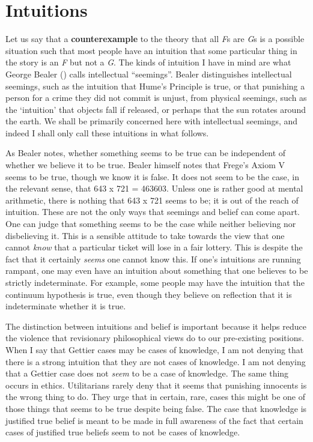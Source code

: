 \documentclass[
  10pt,
  letterpaper,
  DIV=11,
  numbers=noendperiod,
  twoside]{scrartcl}
\begin{document}
\section{Intuitions}\label{intuitions}

Let us say that a \textbf{counterexample} to the theory that all
\emph{F}s are \emph{G}s is a possible situation such that most people
have an intuition that some particular thing in the story is an \emph{F}
but not a \emph{G}. The kinds of intuition I have in mind are what
George Bealer () calls intellectual
``seemings''. Bealer distinguishes intellectual seemings, such as the
intuition that Hume's Principle is true, or that punishing a person for
a crime they did not commit is unjust, from physical seemings, such as
the `intuition' that objects fall if released, or perhaps that the sun
rotates around the earth. We shall be primarily concerned here with
intellectual seemings, and indeed I shall only call these intuitions in
what follows.

As Bealer notes, whether something seems to be true can be independent
of whether we believe it to be true. Bealer himself notes that Frege's
Axiom V seems to be true, though we know it is false. It does not seem
to be the case, in the relevant sense, that 643 x 721 = 463603. Unless
one is rather good at mental arithmetic, there is nothing that 643 x 721
seems to be; it is out of the reach of intuition. These are not the only
ways that seemings and belief can come apart. One can judge that
something seems to be the case while neither believing nor disbelieving
it. This is a sensible attitude to take towards the view that one cannot
\emph{know} that a particular ticket will lose in a fair lottery. This
is despite the fact that it certainly \emph{seems} one cannot know this.
If one's intuitions are running rampant, one may even have an intuition
about something that one believes to be strictly indeterminate. For
example, some people may have the intuition that the continuum
hypothesis is true, even though they believe on reflection that it is
indeterminate whether it is true.

The distinction between intuitions and belief is important because it
helps reduce the violence that revisionary philosophical views do to our
pre-existing positions. When I say that Gettier cases may be cases of
knowledge, I am not denying that there is a strong intuition that they
are not cases of knowledge. I am not denying that a Gettier case does
not \emph{seem} to be a case of knowledge. The same thing occurs in
ethics. Utilitarians rarely deny that it seems that punishing innocents
is the wrong thing to do. They urge that in certain, rare, cases this
might be one of those things that seems to be true despite being false.
The case that knowledge is justified true belief is meant to be made in
full awareness of the fact that certain cases of justified true beliefs
seem to not be cases of knowledge.
\end{document}
